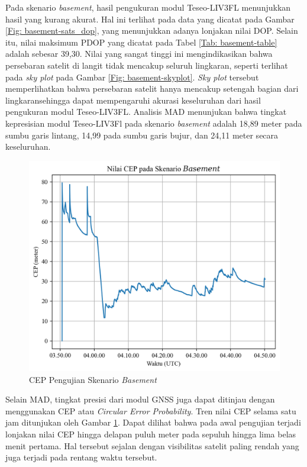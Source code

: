 Pada skenario \textit{basement}, hasil pengukuran modul Teseo-LIV3FL menunjukkan hasil yang kurang akurat. Hal ini terlihat pada data yang dicatat pada Gambar \ref{Fig: basement-sats_dop}, yang menunjukkan adanya lonjakan nilai DOP. Selain itu, nilai maksimum PDOP yang dicatat pada Tabel \ref{Tab: basement-table} adalah sebesar 39,30. Nilai yang sangat tinggi ini mengindikasikan bahwa persebaran satelit di langit tidak mencakup seluruh lingkaran, seperti terlihat pada \textit{sky plot} pada Gambar \ref{Fig: basement-skyplot}. \textit{Sky plot} tersebut memperlihatkan bahwa persebaran satelit hanya mencakup setengah bagian dari lingkaransehingga dapat mempengaruhi akurasi keseluruhan dari hasil pengukuran modul Teseo-LIV3FL. Analisis MAD menunjukan bahwa tingkat kepresisian modul Teseo-LIV3Fl pada skenario \textit{basement} adalah 18,89 meter pada sumbu garis lintang, 14,99 pada sumbu garis bujur, dan 24,11 meter secara keseluruhan.

\begin{figure}[H]
	\centering
	\includegraphics[width=13cm]{contents/chapter-4/1-skenario-basement/cep.png}
	\caption{CEP Pengujian Skenario \textit{Basement}}
	\label{Fig: basement-cep}
\end{figure}

Selain MAD, tingkat presisi dari modul GNSS juga dapat ditinjau dengan menggunakan CEP atau \textit{Circular Error Probability}. Tren nilai CEP selama satu jam ditunjukan oleh Gambar \ref{Fig: basement-cep}. Dapat dilihat bahwa pada awal pengujian terjadi lonjakan nilai CEP hingga delapan puluh meter pada sepuluh hingga lima belas menit pertama. Hal tersebut sejalan dengan visibilitas satelit paling rendah yang juga terjadi pada rentang waktu tersebut. 

